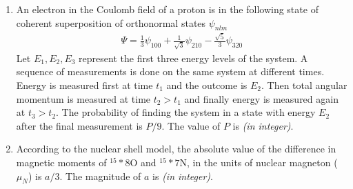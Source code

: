 \documentclass[journal,12pt,onecolumn]{IEEEtran}
\theoremstyle{remark}
\begin{document}
\begin{enumerate}
\item An electron in the Coulomb field of a proton is in the following state of coherent superposition of orthonormal states $\psi_{nlm}$
\begin{align*}
\Psi = \frac{1}{3}\psi_{100} + \frac{1}{\sqrt{3}}\psi_{210} - \frac{\sqrt{5}}{3}\psi_{320}
\end{align*}
Let $E_1, E_2, E_3$ represent the first three energy levels of the system. A sequence of measurements is done on the same system at different times. Energy is measured first at time $t_1$ and the outcome is $E_2$. Then total angular momentum is measured at time $t_2 > t_1$ and finally energy is measured again at $t_3 > t_2$. The probability of finding the system in a state with energy $E_2$ after the final measurement is $P/9$. The value of $P$ is \underline{\hspace{2cm}} \textit{(in integer)}.

\item According to the nuclear shell model, the absolute value of the difference in magnetic moments of $^{15}*{8}\mathrm{O}$ and $^{15}*{7}\mathrm{N}$, in the units of nuclear magneton ($\mu_N$) is $a/3$.
The magnitude of $a$ is \underline{\hspace{2cm}} \textit{(in integer)}.
\end{enumerate}
\end{document}
